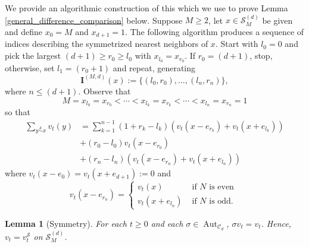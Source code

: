 \documentclass[12pt]{amsart}
\newtheorem{lemma}[theorem]{Lemma}
\begin{document}
	We provide an algorithmic construction of this which we use to prove Lemma \ref{general_difference_comparison} below. Suppose $M \geq 2$, let $x \in \mathcal{S}_M^{(d)}$ be given and define 		
	$x_0 = M$ and $x_{d+1} = 1$.  The following algorithm produces a sequence of indices describing the symmetrized nearest neighbors of $x$. 
	Start with $l_0 = 0$ and pick the largest $(d+1) \geq r_0 \geq l_0$ with 
	$x_{l_0} = x_{r_0}$. If $r_0 = (d+1)$, stop, otherwise, set $l_1 = (r_0 + 1)$
	and repeat, generating
	\begin{equation}
	\mathbf{I}^{(M,d)}(x) := \{ (l_0, r_0), \ldots, (l_n, r_n) \}, 
	\end{equation}
	where $n \leq (d + 1)$. Observe that 
\[	
M = x_{l_0} = x_{r_0} <   \cdots < x_{l_k} = x_{r_k} < \cdots < x_{l_n} = x_{r_n} = 1
\]
	so that  
	\begin{equation}
	\begin{aligned}
	\sum_{y \overset{\mathcal{S}}{\sim}  x} v_t(y) &= \sum_{k=1}^{n-1} (1 + r_k-l_k)\left( v_t(x - e_{r_{k}}) + v_t(x + e_{l_{k}}) \right) \\
	&+ (r_0 - l_0)  v_t(x - e_{r_0}) \\
	&+ (r_n - l_n)  ( v_t(x - e_{r_n}) + v_t(x + e_{l_n}))
	\end{aligned}
	\end{equation}
	where $v_t(x - e_0) = v_t(x + e_{d+1}) := 0$ and 
	\begin{equation}
	v_t(x - e_{r_n}) =  \begin{cases}
	v_t(x) & \mbox{ if $N$ is even } \\
	v_t(x+e_{l_{n}}) & \mbox{ if $N$ is odd}.
	\end{cases}
	\end{equation}


	
		
	
	
	\begin{lemma}[Symmetry]\label{symmetry_lemma}
		For each $t \geq 0$ and each $ \sigma \in \operatorname{Aut}_{\mathcal{C}_d}$, $ \sigma v_t = v_t$. Hence, $v_t = v_t^{\mathcal{S}}$ on $\mathcal{S}^{(d)}_M$.
	\end{lemma}
	
\end{document}
